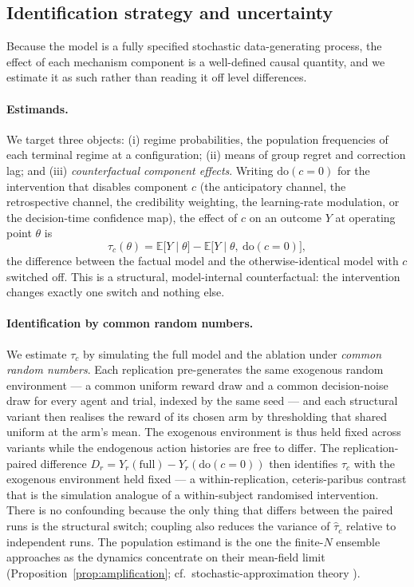 \documentclass[11pt]{article}
\newcommand{\E}{\mathbb{E}}
\newcommand{\1}{\mathbf{1}}
\begin{document}
\subsection{Identification strategy and uncertainty}
\label{sec:identification}
Because the model is a fully specified stochastic data-generating process, the
effect of each mechanism component is a well-defined causal quantity, and we
estimate it as such rather than reading it off level differences.

\paragraph{Estimands.} We target three objects: (i) regime probabilities, the
population frequencies of each terminal regime at a configuration; (ii) means of
group regret and correction lag; and (iii) \emph{counterfactual component
effects}. Writing $\mathrm{do}(c{=}0)$ for the intervention that disables
component $c$ (the anticipatory channel, the retrospective channel, the
credibility weighting, the learning-rate modulation, or the decision-time
confidence map), the effect of $c$ on an outcome $Y$ at operating point $\theta$
is
\[
\tau_c(\theta)=\E\big[Y\mid \theta\big]-\E\big[Y\mid \theta,\ \mathrm{do}(c{=}0)\big],
\]
the difference between the factual model and the otherwise-identical model with
$c$ switched off. This is a structural, model-internal counterfactual: the
intervention changes exactly one switch and nothing else.

\paragraph{Identification by common random numbers.} We estimate $\tau_c$ by
simulating the full model and the ablation under \emph{common random numbers}.
Each replication pre-generates the same exogenous random environment --- a common
uniform reward draw and a common decision-noise draw for every agent and trial,
indexed by the same seed --- and each structural variant then realises the reward
of its chosen arm by thresholding that shared uniform at the arm's mean. The
exogenous environment is thus held fixed across variants while the endogenous
action histories are free to differ. The replication-paired difference
$D_r=Y_r(\text{full})-Y_r(\mathrm{do}(c{=}0))$ then identifies $\tau_c$ with the
exogenous environment held fixed --- a within-replication, ceteris-paribus
contrast that is the simulation analogue of a within-subject randomised
intervention. There is
no confounding because the only thing that differs between the paired runs is the
structural switch; coupling also reduces the variance of $\widehat\tau_c$
relative to independent runs. The population estimand is the one the finite-$N$
ensemble approaches as the dynamics concentrate on their mean-field limit
(Proposition~\ref{prop:amplification}; cf.\ stochastic-approximation theory
\citep{Borkar2008}).
\end{document}
